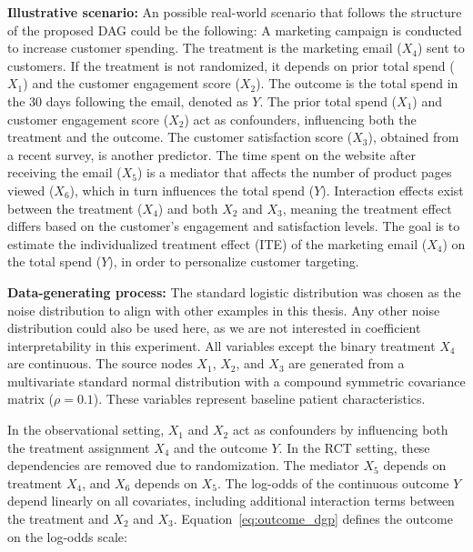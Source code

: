 \vspace{5mm} %

\textbf{Illustrative scenario:} An possible real-world scenario that follows the structure of the proposed DAG could be the following: A marketing campaign is conducted to increase customer spending. The treatment is the marketing email ($X_4$) sent to customers. If the treatment is not randomized, it depends on prior total spend ($X_1$) and the customer engagement score ($X_2$). The outcome is the total spend in the 30 days following the email, denoted as $Y$. The prior total spend ($X_1$) and customer engagement score ($X_2$) act as confounders, influencing both the treatment and the outcome. The customer satisfaction score ($X_3$), obtained from a recent survey, is another predictor. The time spent on the website after receiving the email ($X_5$) is a mediator that affects the number of product pages viewed ($X_6$), which in turn influences the total spend ($Y$). Interaction effects exist between the treatment ($X_4$) and both $X_2$ and $X_3$, meaning the treatment effect differs based on the customer's engagement and satisfaction levels. The goal is to estimate the individualized treatment effect (ITE) of the marketing email ($X_4$) on the total spend ($Y$), in order to personalize customer targeting.

\vspace{5mm} %

\textbf{Data-generating process:} The standard logistic distribution was chosen as the noise distribution to align with other examples in this thesis. Any other noise distribution could also be used here, as we are not interested in coefficient interpretability in this experiment. All variables except the binary treatment $X_4$ are continuous. The source nodes $X_1$, $X_2$, and $X_3$ are generated from a multivariate standard normal distribution with a compound symmetric covariance matrix ($\rho = 0.1$). These variables represent baseline patient characteristics.

In the observational setting, $X_1$ and $X_2$ act as confounders by influencing both the treatment assignment $X_4$ and the outcome $Y$. In the RCT setting, these dependencies are removed due to randomization. The mediator $X_5$ depends on treatment $X_4$, and $X_6$ depends on $X_5$. The log-odds of the continuous outcome $Y$ depend linearly on all covariates, including additional interaction terms between the treatment and $X_2$ and $X_3$. Equation~\ref{eq:outcome_dgp} defines the outcome on the log-odds scale:

